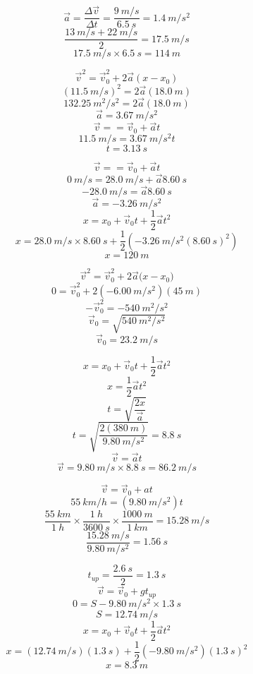 \documentclass[11pt]{homework}
\begin{document}
\setcounter{questionCounter}{34}
\question
  \[
    \vec a = \frac{\Delta \vec v}{\Delta t} = \frac{\qty{9}{m/s}}{\qty{6.5}{s}} = \boxed{\qty{1.4}{m/s^2}} 
  \]
  \[
    \frac{\qty{13}{m/s} + \qty{22}{m/s}}{2} = \qty{17.5}{m/s}
  \]
  \[
    \qty{17.5}{m/s} \times \qty{6.5}{s} = \boxed{\qty{114}{m}}
  \]

\question
  \[
    \vec v^2 = \vec v^2_0 + 2\vec a(x - x_0) 
  \]
  \[
    (\qty{11.5}{m/s})^2 = 2\vec a(\qty{18.0}{m})
  \]
  \[
    \qty{132.25}{m^2/s^2} = 2\vec a(\qty{18.0}{m})
  \]
  \[
    \vec a = \boxed{\qty{3.67}{m/s^2}}
  \]
  \[
    \vec v = = \vec v_0 + \vec at
  \]
  \[
    \qty{11.5}{m/s} = \qty{3.67}{m/s^2}t
  \]
  \[
    t = \boxed{\qty{3.13}{s}}
  \]

\question
  \[
    \vec v = = \vec v_0 + \vec at
  \]
  \[
    \qty{0}{m/s} = \qty{28.0}{m/s} + \vec a\qty{8.60}{s}
  \]
  \[
    \qty{-28.0}{m/s} = \vec a\qty{8.60}{s}
  \]
  \[
   \vec a = \qty{-3.26}{m/s^2}
  \]
  \[
    x=x_{0}+\vec v_{0}t+\frac{1}{2}\vec at^{2} 
  \]
  \[
    x= \qty{28.0}{m/s}\times\qty{8.60}{s} + \frac{1}{2}(\qty{-3.26}{m/s^2}(\qty{8.60}{s})^{2})
  \]
  \[
    x = \boxed{\qty{120}{m}}
  \]

\question
  \[
    \vec v^{2}=\vec v_{0}^{2}+2\vec a\big(x-x_{0}\big)
  \]
  \[
    0 =\vec v_{0}^{2} + 2(\qty{-6.00}{m/s^2})(\qty{45}{m})
  \]
  \[
    -\vec v_{0}^{2} =\qty{-540}{m^2/s^2}  
  \]
  \[
    \vec v_{0} =\sqrt{\qty{540}{m^2/s^2}}
  \]
  \[
    \vec v_{0} =\boxed{\qty{23.2}{m/s}}
  \]

\setcounter{questionCounter}{52}
\question
  \begin{alphaparts}
    \questionpart
      \[
        x = x_{0} + \vec v_{0} t + \frac{1}{2}\vec at^2
      \]
      \[
        x = \frac{1}{2}\vec at^2
      \]
      \[
        t = \sqrt{\frac{2x}{\vec a}}
      \]
      \[
        t = \sqrt{\frac{2(\qty{380}{m})}{\qty{9.80}{m/s^2}}} = \boxed{\qty{8.8}{s}}
      \]
    \questionpart
      \[
        \vec v = \vec at
      \]
      \[
        \vec v = \qty{9.80}{m/s} \times \qty{8.8}{s} = \boxed{\qty{86.2}{m/s}}
      \]
  \end{alphaparts}
\question
  \[
    \vec v = \vec v_0 + at
  \]
  \[
    \qty{55}{km/h} = (\qty{9.80}{m/s^2})t
  \]
  \[
    \frac{\qty{55}{km}}{\qty{1}{h}} \times \frac{\qty{1}{h}}{\qty{3600}{s}} \times\frac{\qty{1000}{m}}{\qty{1}{km}} = \qty{15.28}{m/s}
  \]
  \[
    \frac{\qty{15.28}{m/s}}{\qty{9.80}{m/s^2}} = \boxed{\qty{1.56}{s}}
  \]

\question
  \[
    t_{up} = \frac{\qty{2.6}{s}}{2} = \qty{1.3}{s}
  \]
  \[
    \vec v = \vec v_0 + gt_{up}
  \]
  \[
    0 = S - \qty{9.80}{m/s^2}\times\qty{1.3}{s}
  \]
  \[
    S = \boxed{\qty{12.74}{m/s}}
  \]
  \[
    x = x_0 + \vec v_0 t + \frac{1}{2}\vec at^2
  \]
  \[
    x = (\qty{12.74}{m/s})(\qty{1.3}{s}) + \frac{1}{2}(\qty{-9.80}{m/s^2})(\qty{1.3}{s})^2
  \]
  \[
    x = \boxed{\qty{8.3}{m}}
  \]
\end{document}
